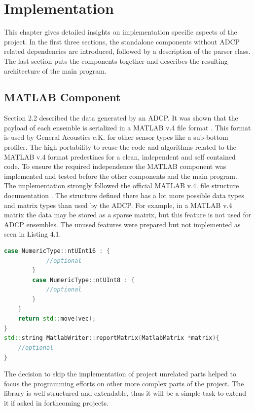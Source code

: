 \chapter{Implementation}
This chapter gives detailed insights on implementation specific aspects of the project. In the first three sections, the standalone components without ADCP related dependencies are introduced, followed by a description of the parser class. The last section puts the components together and describes the resulting architecture of the main program. 
\section{MATLAB Component}
Section 2.2 described the data generated by an ADCP. It was shown that the payload of each ensemble is serialized in a MATLAB v.4 file format \cite{matlab}. This format is used by General Acoustics e.K. for other sensor types like a sub-bottom profiler. The high portability to reuse the code and algorithms related to the MATLAB v.4 format predestines for a clean, independent and self contained code. To ensure the required independence the MATLAB component was implemented and tested before the other components and the main program.\\
The implementation strongly followed the official MATLAB v.4. file structure documentation \cite{matlab}. The structure defined there has a lot more possible data types and matrix types than used by the ADCP. For example, in a MATLAB v.4 matrix the data may be stored as a sparse matrix, but this feature is not used for ADCP ensembles. The unused features were prepared but not implemented as seen in Listing 4.1.
\pagebreak
\begin{lstlisting}[language=C++, caption=Code snippet of not implemented logic]
        case NumericType::ntUInt16 : {
            //optional
        }
        case NumericType::ntUInt8 : {
            //optional
        }
    }
    return std::move(vec);
}
std::string MatlabWriter::reportMatrix(MatlabMatrix *matrix){
    //optional
}
\end{lstlisting}

The decision to skip the implementation of project unrelated parts helped to focus the programming efforts on other more complex parts of the project. The library is well structured and extendable, thus it will be a simple task to extend it if asked in forthcoming projects.

